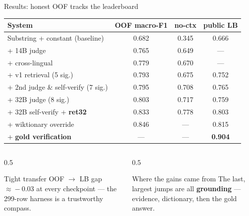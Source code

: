 \documentclass[aspectratio=169,11pt,t]{beamer}
\newcommand{\metric}[1]{{\color{primary}\bfseries #1}}
\begin{document}
\begin{frame}{Results: honest OOF tracks the leaderboard}
  \centering
  \footnotesize
  \begin{tabular}{lccc}
    \toprule
    System & OOF macro-F1 & no-ctx & public LB \\
    \midrule
    Substring + constant (baseline)      & 0.682 & 0.345 & 0.666 \\
    \;+ 14B judge                        & 0.765 & 0.649 & --- \\
    \;+ cross-lingual                    & 0.779 & 0.670 & --- \\
    \;+ v1 retrieval (5 sig.)            & 0.793 & 0.675 & 0.752 \\
    \;+ 2nd judge \& self-verify (7 sig.)& 0.795 & 0.708 & 0.765 \\
    \;+ 32B judge (8 sig.)               & 0.803 & 0.717 & 0.759 \\
    \;+ 32B self-verify + \textbf{ret32} & 0.833 & 0.778 & 0.803 \\
    \;+ wiktionary override              & 0.846 & --- & 0.815 \\
    \;+ \textbf{gold verification}       & --- & --- & \metric{\textbf{0.904}} \\
    \bottomrule
  \end{tabular}
  \vspace{0.5em}
  \begin{columns}[T]
    \begin{column}{0.5\textwidth}
      \begin{block}{Tight transfer}
        \footnotesize OOF $\to$ LB gap $\approx\!-0.03$ at every checkpoint — the 299-row harness is a trustworthy compass.
      \end{block}
    \end{column}
    \begin{column}{0.5\textwidth}
      \begin{block}{Where the gains came from}
        \footnotesize The last, largest jumps are all \textbf{grounding} — evidence, dictionary, then the gold answer.
      \end{block}
    \end{column}
  \end{columns}
\end{frame}
\end{document}
